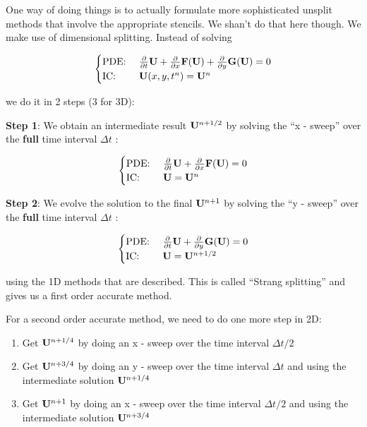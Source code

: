 One way of doing things is to actually formulate more sophisticated unsplit
methods that involve the appropriate stencils. We shan't do that here though.
We make use of dimensional splitting. Instead of solving

\begin{equation}
\begin{cases}
\text{PDE: } &
	\frac{\partial}{\partial t}{\mathbf{U}} + \frac{\partial}{\partial x}{\mathbf{F}(\mathbf{U})} + \frac{\partial}{\partial y} \mathbf{G}(\mathbf{U}) = 0
\\
\text{IC: } &
	\mathbf{U}(x, y, t^n) = \mathbf{U}^n
\end{cases}
\end{equation}

we do it in 2 steps (3 for 3D):

\textbf{Step 1}: We obtain an intermediate result $\mathbf{U}^{n+1/2}$ by solving the
``x - sweep'' over the \textbf{full} time interval $\Delta t$ :

\begin{equation}
\begin{cases}
	\text{PDE: } & \frac{\partial}{\partial t}{\mathbf{U}} + \frac{\partial}{\partial x}{\mathbf{F}(\mathbf{U})} = 0\\
	\text{IC: } &  \mathbf{U} = \mathbf{U}^n
\end{cases}
\end{equation}

\textbf{Step 2}: We evolve the solution to the final $\mathbf{U}^{n+1}$ by solving the
``y - sweep'' over the \textbf{full} time interval $\Delta t$ :

\begin{equation}
\begin{cases}
\text{PDE: } &
	\frac{\partial}{\partial t}{\mathbf{U}} + \frac{\partial}{\partial y} \mathbf{G}(\mathbf{U}) = 0
\\
\text{IC: } &
	\mathbf{U} = \mathbf{U}^{n+1/2}
\\
\end{cases}
\end{equation}

using the 1D methods that are described.
This is called ``Strang splitting'' and gives us a first order accurate method.

For a second order accurate method, we need to do one more step in 2D:

\begin{enumerate}
	\item Get $\mathbf{U}^{n + 1/4}$ by doing an x - sweep over the time interval $\Delta t / 2$
	\item Get $\mathbf{U}^{n + 3/4}$ by doing an y - sweep over the time interval $\Delta t$ and using the intermediate solution $\mathbf{U}^{n + 1/4}$
	\item Get $\mathbf{U}^{n + 1}$ by doing an x - sweep over the time interval $\Delta t / 2$ and using the intermediate solution $\mathbf{U}^{n + 3/4}$
\end{enumerate}

